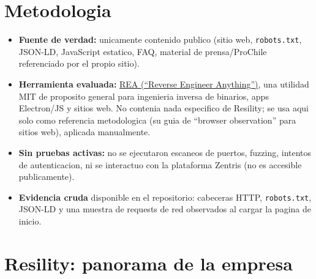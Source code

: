 \documentclass[11pt,a4paper]{article}
\begin{document}
\section{Metodologia}

\begin{itemize}[leftmargin=1.4em]
  \item \textbf{Fuente de verdad:} unicamente contenido publico (sitio web, \texttt{robots.txt},
  JSON-LD, JavaScript estatico, FAQ, material de prensa/ProChile referenciado por el propio sitio).
  \item \textbf{Herramienta evaluada:} \href{https://github.com/morluto/rea}{REA (``Reverse
  Engineer Anything'')}, una utilidad MIT de proposito general para ingenieria inversa de
  binarios, apps Electron/JS y sitios web. No contenia nada especifico de Resility; se usa aqui
  solo como referencia metodologica (su guia de ``browser observation'' para sitios web),
  aplicada manualmente.
  \item \textbf{Sin pruebas activas:} no se ejecutaron escaneos de puertos, fuzzing, intentos de
  autenticacion, ni se interactuo con la plataforma Zentris (no es accesible publicamente).
  \item \textbf{Evidencia cruda} disponible en el repositorio: cabeceras HTTP, \texttt{robots.txt},
  JSON-LD y una muestra de requests de red observados al cargar la pagina de inicio.
\end{itemize}

\section{Resility: panorama de la empresa}
\end{document}
